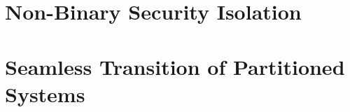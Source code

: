 %



\section{Non-Binary Security Isolation}


\section{Seamless Transition of Partitioned Systems}




